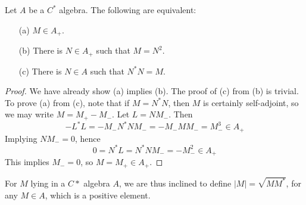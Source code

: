 \begin{prop}
    Let $A$ be a $C^*$ algebra. The following are equivalent:
    \begin{enumerate}
        \item[(a)] $M \in A_+$.
        \item[(b)] There is $N \in A_+$ such that $M = N^2$.
        \item[(c)] There is $N \in A$ such that $N^*N = M$.
    \end{enumerate}
\end{prop}
\begin{proof}
    We have already show (a) implies (b). The proof of (c) from (b) is trivial. To prove (a) from (c), note that if $M = N^*N$, then $M$ is certainly self-adjoint, so we may write $M = M_+ - M_-$. Let $L = NM_-$. Then
    \[ - L^*L = - M_-N^*NM_- = - M_- M M_- = M_-^3 \in A_+ \]
    Implying $NM_- = 0$, hence
    \[ 0 = N^*L = N^*NM_- = -M_-^2 \in A_+ \]
    This implies $M_- = 0$, so $M = M_+ \in A_+$.
\end{proof}

For $M$ lying in a $C*$ algebra $A$, we are thus inclined to define $|M| = \sqrt{MM^*}$, for any $M \in A$, which is a positive element.

